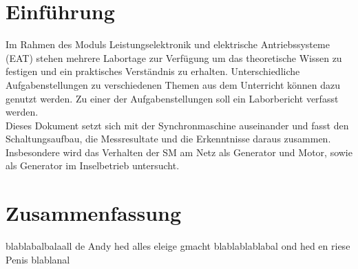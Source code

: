 

\section*{Einführung}

Im Rahmen des Moduls Leistungselektronik und elektrische Antriebssysteme (EAT) stehen mehrere Labortage zur Verfügung um das theoretische Wissen zu festigen und ein praktisches Verständnis zu erhalten.
Unterschiedliche Aufgabenstellungen zu verschiedenen Themen aus dem Unterricht können dazu genutzt werden.
Zu einer der Aufgabenstellungen soll ein Laborbericht verfasst werden.\\

Dieses Dokument setzt sich mit der Synchronmaschine auseinander und fasst den Schaltungsaufbau, die Messresultate und die Erkenntnisse daraus zusammen.\\
Insbesondere wird das Verhalten der SM am Netz als Generator und Motor, sowie als Generator im Inselbetrieb untersucht.




\section*{Zusammenfassung}

blablabalbalaall de Andy hed alles eleige gmacht blablablablabal ond hed en riese Penis blablanal
